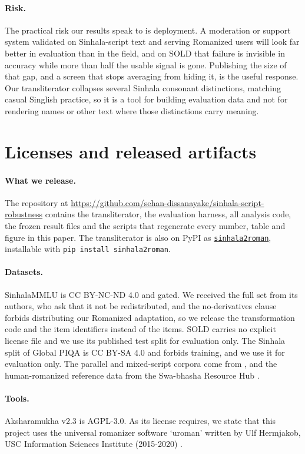\documentclass{article}
\newcommand{\repo}{\url{https://github.com/sehan-dissanayake/sinhala-script-robustness}}
\newcommand{\pypi}{\href{https://pypi.org/project/sinhala2roman}{\texttt{sinhala2roman}}}
\begin{document}
\paragraph{Risk.} The practical risk our results speak to is deployment. A moderation
or support system validated on Sinhala-script text and serving Romanized users will
look far better in evaluation than in the field, and on SOLD that failure is invisible
in accuracy while more than half the usable signal is gone. Publishing the size of
that gap, and a screen that stops averaging from hiding it, is the useful response.
Our transliterator collapses several Sinhala consonant distinctions, matching casual
Singlish practice, so it is a tool for building evaluation data and not for rendering
names or other text where those distinctions carry meaning.

\section{Licenses and released artifacts}
\label{sec:licences}

\paragraph{What we release.} The repository at \repo{} contains the
transliterator, the evaluation harness, all analysis code, the frozen result files
and the scripts that regenerate every number, table and figure in this paper. The
transliterator is also on PyPI as \pypi, installable with
\texttt{pip install sinhala2roman}.

\paragraph{Datasets.} SinhalaMMLU \citep{pramodya-etal-2025-sinhalammlu} is CC
BY-NC-ND 4.0 and gated. We received the full set from its authors, who ask that it
not be redistributed, and the no-derivatives clause forbids distributing our
Romanized adaptation, so we release the transformation code and the item identifiers
instead of the items. SOLD \citep{ranasinghe-etal-2025-sold} carries no explicit
license file and we use its published test split for evaluation only. The Sinhala
split of Global PIQA \citep{chang-etal-2025-globalpiqa,
desilva-ranathunga-2026-sinhalapiqa} is CC BY-SA 4.0 and forbids training, and we use
it for evaluation only. The parallel and mixed-script corpora come from
\citet{rajapakse-weerasinghe-2026-script}, and the human-romanized reference data
from the Swa-bhasha Resource Hub \citep{sumanathilaka-etal-2025-swabhasha}.

\paragraph{Tools.} Aksharamukha \citep{rajan-aksharamukha} v2.3 is AGPL-3.0. As its
license requires, we state that this project uses the universal romanizer software
`uroman' written by Ulf Hermjakob, USC Information Sciences Institute (2015-2020)
\citep{hermjakob-etal-2018-uroman}.

\newpage

\end{document}
